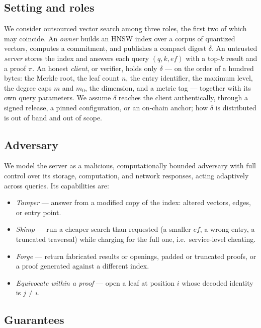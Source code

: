 \documentclass[11pt]{article}
\begin{document}
\subsection{Setting and roles}

We consider outsourced vector search among three roles, the first two of
which may coincide. An \emph{owner} builds an HNSW index over a corpus
of quantized vectors, computes a commitment, and publishes a compact
digest $\delta$. An untrusted \emph{server} stores the index and answers
each query $(q, k, \mathit{ef})$ with a top-$k$ result and a proof
$\pi$. An honest \emph{client}, or verifier, holds only $\delta$ --- on
the order of a hundred bytes: the Merkle root, the leaf count $n$, the
entry identifier, the maximum level, the degree caps $m$ and $m_0$, the
dimension, and a metric tag --- together with its own query parameters.
We assume $\delta$ reaches the client authentically, through a signed
release, a pinned configuration, or an on-chain anchor; how $\delta$ is
distributed is out of band and out of scope.

\subsection{Adversary}

We model the server as a malicious, computationally bounded adversary
with full control over its storage, computation, and network responses,
acting adaptively across queries. Its capabilities are:

\begin{itemize}
\item \emph{Tamper} --- answer from a modified copy of the index:
  altered vectors, edges, or entry point.
\item \emph{Skimp} --- run a cheaper search than requested (a smaller
  $\mathit{ef}$, a wrong entry, a truncated traversal) while charging
  for the full one, i.e.\ service-level cheating.
\item \emph{Forge} --- return fabricated results or openings, padded or
  truncated proofs, or a proof generated against a different index.
\item \emph{Equivocate within a proof} --- open a leaf at position $i$
  whose decoded identity is $j \neq i$.
\end{itemize}

\subsection{Guarantees}
\end{document}
